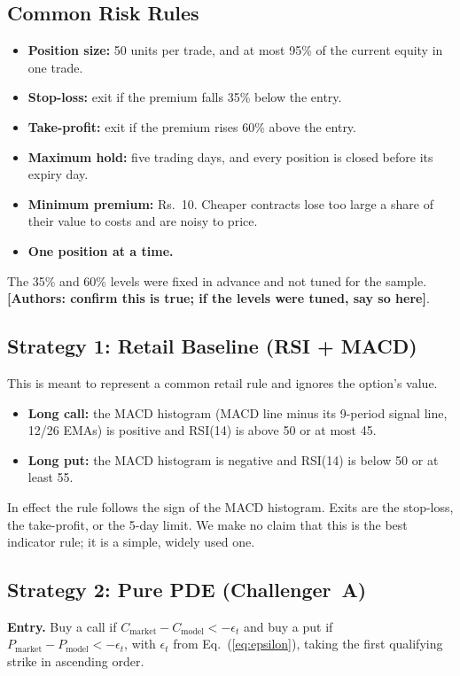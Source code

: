 \documentclass[10pt,journal,compsoc]{IEEEtran}
\newcommand{\fillin}[1]{\textbf{[#1]}}
\begin{document}
\subsection{Common Risk Rules}
\begin{itemize}
    \item \textbf{Position size:} 50 units per trade, and at most 95\% of the current equity in one trade.
    \item \textbf{Stop-loss:} exit if the premium falls 35\% below the entry.
    \item \textbf{Take-profit:} exit if the premium rises 60\% above the entry.
    \item \textbf{Maximum hold:} five trading days, and every position is closed before its expiry day.
    \item \textbf{Minimum premium:} Rs.~10. Cheaper contracts lose too large a share of their value to costs and are noisy to price.
    \item \textbf{One position at a time.}
\end{itemize}
The 35\% and 60\% levels were fixed in advance and not tuned for the sample. \fillin{Authors: confirm this is true; if the levels were tuned, say so here}.

\subsection{Strategy 1: Retail Baseline (RSI + MACD)}
This is meant to represent a common retail rule and ignores the option's value.
\begin{itemize}
    \item \textbf{Long call:} the MACD histogram (MACD line minus its 9-period signal line, 12/26 EMAs) is positive and RSI(14) is above 50 or at most 45.
    \item \textbf{Long put:} the MACD histogram is negative and RSI(14) is below 50 or at least 55.
\end{itemize}
In effect the rule follows the sign of the MACD histogram. Exits are the stop-loss, the take-profit, or the 5-day limit. We make no claim that this is the best indicator rule; it is a simple, widely used one.

\subsection{Strategy 2: Pure PDE (Challenger~A)}
\textbf{Entry.} Buy a call if $C_{\text{market}} - C_{\text{model}} < -\epsilon_t$ and buy a put if $P_{\text{market}} - P_{\text{model}} < -\epsilon_t$, with $\epsilon_t$ from Eq.~(\ref{eq:epsilon}), taking the first qualifying strike in ascending order.
\end{document}
